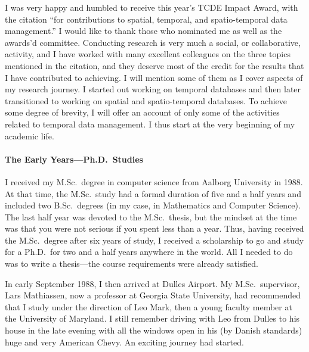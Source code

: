 \documentclass[11pt]{article}
\begin{document}

I was very happy and humbled to receive this year's TCDE Impact Award, with the citation ``for contributions to spatial, temporal, and spatio-temporal data
management.'' I would like to thank those who nominated me as well as the awards'd committee. Conducting research is very much a social, or collaborative, activity, and I have worked with many excellent colleagues on the three topics mentioned in the citation, and they deserve most of the credit for the results that I have contributed to achieving. I will mention some of them as I cover aspects of my research journey. I started out working on temporal databases and then later transitioned to working on spatial and spatio-temporal databases. To achieve some degree of brevity, I will offer an account of only some of the activities related to temporal data management. I thus start at the very beginning of my academic life.

\paragraph{The Early Years---Ph.D.\ Studies} I received my M.Sc.\ degree in computer science from Aalborg University in 1988.  At that time, the M.Sc.\ study had a formal duration of five and a half years and included two B.Sc.\ degrees (in my case, in Mathematics and Computer Science). The last half year was devoted to the M.Sc.\ thesis, but the mindset at the time was that you were not serious if you spent less than a year. Thus, having received the M.Sc.\ degree after six years of study, I received a scholarship to go and study for a Ph.D.\ for two and a half years anywhere in the world. All I needed to do was to write a thesis---the course requirements were already satisfied.

In early September 1988, I then arrived at Dulles Airport. My M.Sc.\ supervisor, Lars Mathiassen, now a professor at Georgia State University, had recommended that I study under the direction of Leo Mark, then a young faculty member at the University of Maryland. I still remember driving with Leo from Dulles to his house in the late evening with all the windows open in his (by Danish standards) huge and very American Chevy. An exciting journey had started.
\end{document}
